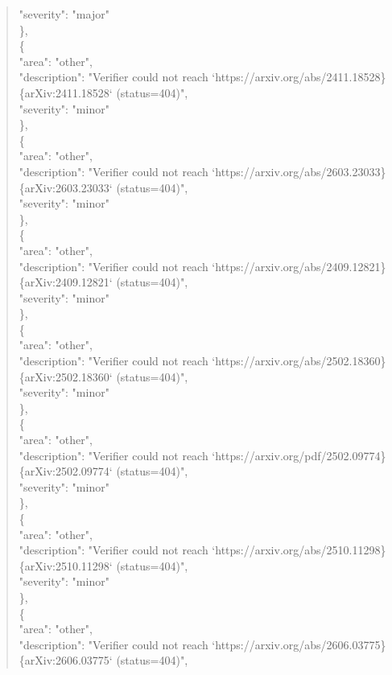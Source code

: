 \documentclass[11pt]{article}
\begin{document}
\begin{quote}
      "severity": "major"\\
    \},\\
    \{\\
      "area": "other",\\
      "description": "Verifier could not reach `https://arxiv.org/abs/2411.18528\}\{arXiv:2411.18528` (status=404)",\\
      "severity": "minor"\\
    \},\\
    \{\\
      "area": "other",\\
      "description": "Verifier could not reach `https://arxiv.org/abs/2603.23033\}\{arXiv:2603.23033` (status=404)",\\
      "severity": "minor"\\
    \},\\
    \{\\
      "area": "other",\\
      "description": "Verifier could not reach `https://arxiv.org/abs/2409.12821\}\{arXiv:2409.12821` (status=404)",\\
      "severity": "minor"\\
    \},\\
    \{\\
      "area": "other",\\
      "description": "Verifier could not reach `https://arxiv.org/abs/2502.18360\}\{arXiv:2502.18360` (status=404)",\\
      "severity": "minor"\\
    \},\\
    \{\\
      "area": "other",\\
      "description": "Verifier could not reach `https://arxiv.org/pdf/2502.09774\}\{arXiv:2502.09774` (status=404)",\\
      "severity": "minor"\\
    \},\\
    \{\\
      "area": "other",\\
      "description": "Verifier could not reach `https://arxiv.org/abs/2510.11298\}\{arXiv:2510.11298` (status=404)",\\
      "severity": "minor"\\
    \},\\
    \{\\
      "area": "other",\\
      "description": "Verifier could not reach `https://arxiv.org/abs/2606.03775\}\{arXiv:2606.03775` (status=404)",\\

\end{quote}
\end{document}
